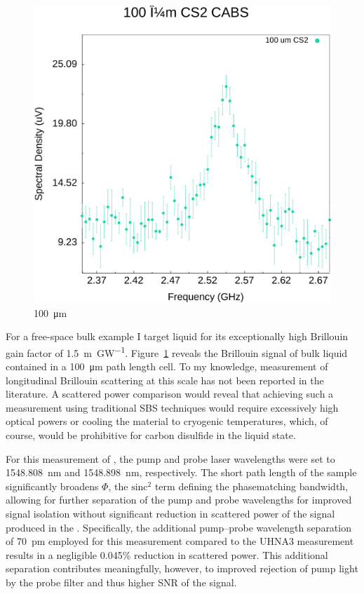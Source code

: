 \begin{figure}[t]
  \centering
  \includegraphics[width=\textwidth]{figs/4-CABS/100umCS2.pdf}
  \caption{\SI{100}{\micro\meter} }
  \label{fig:100umCS2}
\end{figure}

\FloatBarrier

For a free-space bulk example I target liquid  for its exceptionally high Brillouin gain factor of \SI{1.5}{\meter\per\giga\watt}.\cite{boyd2020nonlinear} Figure~\ref{fig:100umCS2} reveals the Brillouin signal of bulk  liquid contained in a \SI{100}{\micro\meter} path length cell. To my knowledge, measurement of longitudinal Brillouin scattering at this scale has not been reported in the literature. A scattered power comparison would reveal that achieving such a measurement using traditional SBS techniques would require excessively high optical powers or cooling the material to cryogenic temperatures, which, of course, would be prohibitive for carbon disulfide in the liquid state.

For this measurement of , the pump and probe laser wavelengths were set to \SI{1548.808}{\nano\meter} and \SI{1548.898}{\nano\meter}, respectively. The short path length of the sample significantly broadens \(\Phi\), the \(\mathrm{sinc^2}\) term defining the phasematching bandwidth, allowing for further separation of the pump and probe wavelengths for improved signal isolation without significant reduction in scattered power of the signal produced in the . Specifically, the additional pump--probe wavelength separation of \SI{70}{\pico\meter} employed for this measurement compared to the UHNA3 measurement results in a negligible 0.045\% reduction in scattered power. This additional separation contributes meaningfully, however, to improved rejection of pump light by the probe filter and thus higher SNR of the signal.

